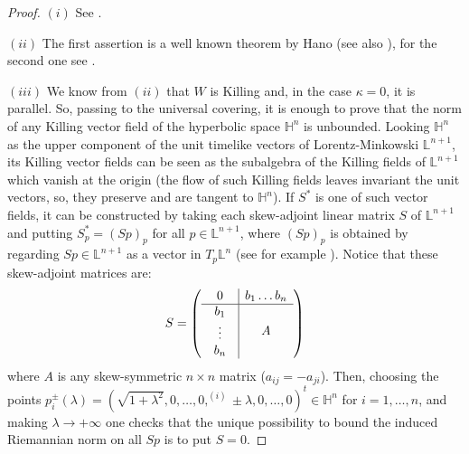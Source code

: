 \documentclass[reqno,10pt]{amsart}
\newcommand{\LL}{\mathds L}
\newcommand{\HH}{\mathds H}
\begin{document}
\begin{proof}
$(i)$ See \cite[Lemma VI.2 (p. 242)]{KoNo1}.

$(ii)$ The first assertion is a well known theorem by Hano \cite[Theorem 2]{Han} (see also \cite[Theorem VI.3.8]{KoNo1}), for the second one see \cite[Lemma 4]{Han}.

$(iii)$ We know from  $(ii)$  that $W$ is Killing and, in the case $\kappa=0$, it is parallel. So, passing to the universal covering, it is enough to prove that the norm of any Killing vector field of the  hyperbolic space $\HH^n$ is unbounded. Looking $\HH^n$ as 
the upper component of the unit timelike vectors of Lorentz-Minkowski $\LL^{n+1}$, its Killing vector fields can be seen as the subalgebra of the Killing fields of $\LL^{n+1}$ which vanish at the origin (the flow of such Killing fields  leaves  invariant the unit vectors, so, they 
preserve and are tangent to $\HH^n$).  If $S^*$ is one of such vector fields, it can be  constructed by taking each skew-adjoint linear matrix $S$ of $\LL^{n+1}$ 
and putting $S^*_p=(Sp)_p$ for all $p\in \LL^{n+1}$, where $(Sp)_p$ is obtained by regarding  $Sp\in 
\LL^{n+1}$ as a vector in $T_p\LL^n$ (see for example 
\cite[Example 9.29]{Oneill83}). Notice that these skew-adjoint matrices are:
$$
S= \left(
\begin{array}{c | c}
0 & b_1  \dots b_n \\
\hline
\begin{array}{c}
b_1 \\ \vdots \\ b_n 
\end{array}
& A
\end{array} \right)
$$
where $A$ is any skew-symmetric $n\times n$ matrix ($a_{ij}=-a_{ji}$). Then, choosing the points $p_i^\pm(\lambda)= (\sqrt{1+\lambda^2},0,\dots, 0,^{(i)} \pm \lambda, 0, \dots , 0)^t\in \HH^n$ for $i=1, \dots, n$, and making $\lambda\rightarrow +\infty$ one checks that the unique possibility to bound the induced Riemannian norm on all $Sp$ is to put $S=0$. 
\end{proof}
\end{document}
